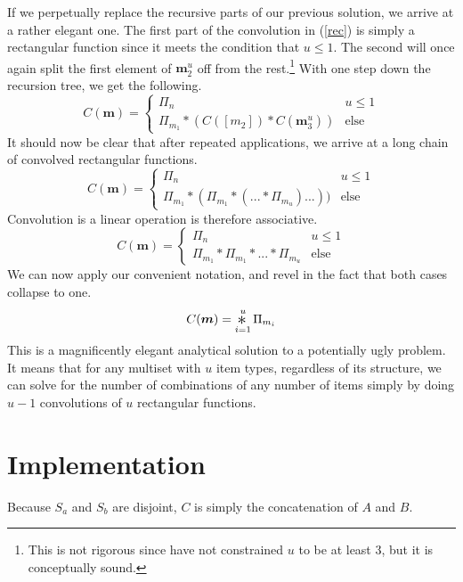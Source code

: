 \documentclass{article}
\newcommand{\Conv}{\mathop{\scalebox{1.5}{\raisebox{-0.2ex}{$\ast$}}}}%
\begin{document}
If we perpetually replace the recursive parts of our previous solution, we arrive at a rather elegant one. The first part of the convolution in (\ref{rec}) is simply a rectangular function since it meets the condition that $u\leq 1$. The second will once again split the first element of $\bm{m}_2^u$ off from the rest.\footnote{This is not rigorous since have not constrained $u$ to be at least 3, but it is conceptually sound.} With one step down the recursion tree, we get the following.
\begin{equation}
    C(\bm{m}) = \begin{cases}\Pi_n & u \leq 1 \\
    \Pi_{m_1} * (C([m_2]) * C(\bm{m}_3^u)) & \text{else} \end{cases}
\end{equation}
It should now be clear that after repeated applications, we arrive at a long chain of convolved rectangular functions.
\begin{equation}
    C(\bm{m}) = \begin{cases}\Pi_n & u \leq 1 \\
    \Pi_{m_1} * (\Pi_{m_1} * (... * \Pi_{m_u})...)) & \text{else} \end{cases}
\end{equation}
Convolution is a linear operation is therefore associative.
\begin{equation}
    C(\bm{m}) = \begin{cases}\Pi_n & u \leq 1 \\
    \Pi_{m_1} * \Pi_{m_1} * ... * \Pi_{m_u} & \text{else} \end{cases}
\end{equation}
We can now apply our convenient notation, and revel in the fact that both cases collapse to one.
\begin{equation}
    C(\bm{m}) = \Conv_{i=1}^u \Pi_{m_i}
\end{equation}
This is a magnificently elegant analytical solution to a potentially ugly problem. It means that for any multiset with $u$ item types, regardless of its structure, we can solve for the number of combinations of any number of items simply by doing $u-1$ convolutions of $u$ rectangular functions.

\section{Implementation}

\pagebreak


Because $S_a$ and $S_b$ are disjoint, $C$ is simply the concatenation of $A$ and $B$.
\end{document}
